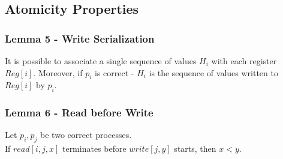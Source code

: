\subsection{Atomicity Properties}
\begin{frame}
    \frametitle{Lemma 5 - Write Serialization}
    \begin{lemma}
        It is possible to associate a single sequence of values $H_i$
        with each register $Reg[i]$. Moreover, if $p_i$ is correct -
        $H_i$ is the sequence of values written to $Reg[i]$ by $p_i$.
    \end{lemma}
\end{frame}
\begin{frame}
    \frametitle{Lemma 6 - Read before Write}
    \begin{lemma}
        Let $p_i, p_j$ be two correct processes.\\
        If $read[i,j,x]$ terminates before $write[j,y]$ starts, then $x<y$.
    \end{lemma}
\end{frame}
